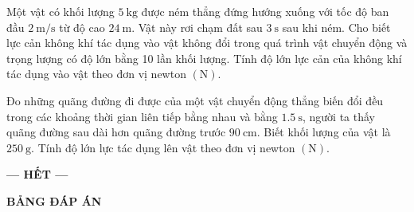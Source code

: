 \begin{ex}
	Một vật có khối lượng $\SI{5}{\kilogram}$ được ném thẳng đứng hướng xuống với tốc độ ban đầu $\SI{2}{\meter/\second}$ từ độ cao $\SI{24}{\meter}$. Vật này rơi chạm đất sau $\SI{3}{\second}$ sau khi ném. Cho biết lực cản không khí tác dụng vào vật không đổi trong quá trình vật chuyển động và trọng lượng có độ lớn bằng 10 lần khối lượng. Tính độ lớn lực cản của không khí tác dụng vào vật theo đơn vị newton $\left(\si{\newton}\right)$.
	\loigiai{
		
	}
\end{ex}
\begin{ex}
	Đo những quãng đường đi được của một vật chuyển động thẳng biến đổi đều trong các khoảng thời gian liên tiếp bằng nhau và bằng $\SI{1.5}{\second}$, người ta thấy quãng đường sau dài hơn quãng đường trước $\SI{90}{\centi\meter}$. Biết khối lượng của vật là $\SI{250}{\gram}$. Tính độ lớn lực tác dụng lên vật theo đơn vị newton $\left(\si{\newton}\right)$. 	
	\loigiai{
		
	}
\end{ex}
\begin{center}
	\textbf{--- HẾT ---}
\end{center}
\newpage
\setcounter{section}{0}
\begin{center}
	\textbf{\large BẢNG ĐÁP ÁN}
\end{center}
\section{}
\section{}
\section{}
